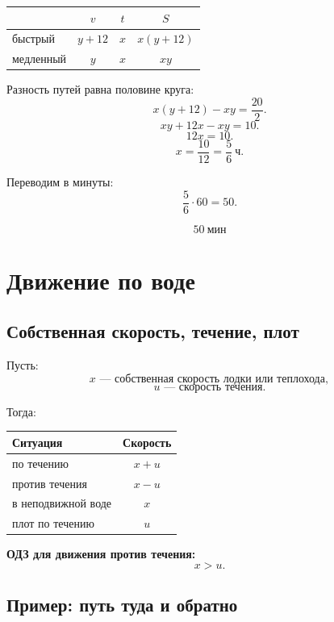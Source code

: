 \documentclass[a4paper,12pt]{article}
\newcommand{\important}[1]{\textcolor{darkaccent}{\textbf{#1}}}
\newcommand{\ch}{\text{ч}}
\newcommand{\minut}{\text{мин}}
\begin{document}
\begin{center}
\renewcommand{\arraystretch}{1.35}
\begin{tabularx}{0.78\linewidth}{X c c c}
\toprule
 & $v$ & $t$ & $S$ \\
\midrule
быстрый & $y+12$ & $x$ & $x(y+12)$ \\
медленный & $y$ & $x$ & $xy$ \\
\bottomrule
\end{tabularx}
\end{center}

Разность путей равна половине круга:
\[
x(y+12)-xy=\frac{20}{2}.
\]
\[
xy+12x-xy=10.
\]
\[
12x=10.
\]
\[
x=\frac{10}{12}=\frac{5}{6}\ \ch.
\]

Переводим в минуты:
\[
\frac{5}{6}\cdot 60=50.
\]

\[
\boxed{50\ \minut}
\]

\section{Движение по воде}

\subsection{Собственная скорость, течение, плот}

Пусть:
\[
x \text{ --- собственная скорость лодки или теплохода},
\]
\[
u \text{ --- скорость течения}.
\]

Тогда:

\begin{center}
\renewcommand{\arraystretch}{1.35}
\begin{tabularx}{0.82\linewidth}{X c}
\toprule
\textbf{Ситуация} & \textbf{Скорость} \\
\midrule
по течению & $x+u$ \\
против течения & $x-u$ \\
в неподвижной воде & $x$ \\
плот по течению & $u$ \\
\bottomrule
\end{tabularx}
\end{center}

\important{ОДЗ для движения против течения:}
\[
x>u.
\]

\subsection{Пример: путь туда и обратно}
\end{document}
